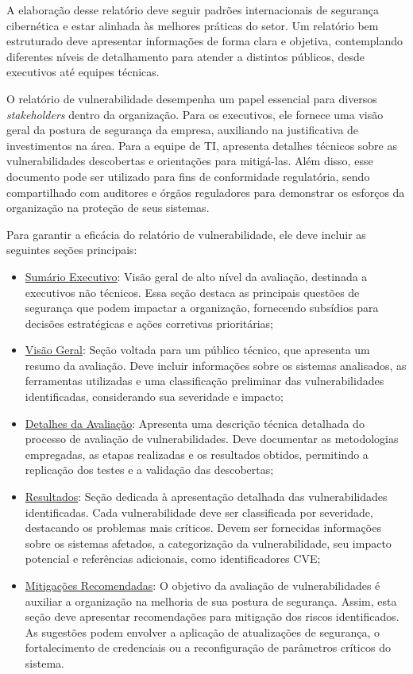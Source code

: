         A elaboração desse relatório deve seguir padrões internacionais de segurança cibernética e estar alinhada às melhores práticas do setor. Um relatório bem estruturado deve apresentar informações de forma clara e objetiva, contemplando diferentes níveis de detalhamento para atender a distintos públicos, desde executivos até equipes técnicas.
        
        O relatório de vulnerabilidade desempenha um papel essencial para diversos \textit{stakeholders} dentro da organização. Para os executivos, ele fornece uma visão geral da postura de segurança da empresa, auxiliando na justificativa de investimentos na área. Para a equipe de TI, apresenta detalhes técnicos sobre as vulnerabilidades descobertas e orientações para mitigá-las. Além disso, esse documento pode ser utilizado para fins de conformidade regulatória, sendo compartilhado com auditores e órgãos reguladores para demonstrar os esforços da organização na proteção de seus sistemas.
        
        Para garantir a eficácia do relatório de vulnerabilidade, ele deve incluir as seguintes seções principais:
        
        \begin{itemize}
            \item \underline{Sumário Executivo}: Visão geral de alto nível da avaliação, destinada a executivos não técnicos. Essa seção destaca as principais questões de segurança que podem impactar a organização, fornecendo subsídios para decisões estratégicas e ações corretivas prioritárias;
            \item \underline{Visão Geral}: Seção voltada para um público técnico, que apresenta um resumo da avaliação. Deve incluir informações sobre os sistemas analisados, as ferramentas utilizadas e uma classificação preliminar das vulnerabilidades identificadas, considerando sua severidade e impacto;
            \item \underline{Detalhes da Avaliação}: Apresenta uma descrição técnica detalhada do processo de avaliação de vulnerabilidades. Deve documentar as metodologias empregadas, as etapas realizadas e os resultados obtidos, permitindo a replicação dos testes e a validação das descobertas;
            \item \underline{Resultados}: Seção dedicada à apresentação detalhada das vulnerabilidades identificadas. Cada vulnerabilidade deve ser classificada por severidade, destacando os problemas mais críticos. Devem ser fornecidas informações sobre os sistemas afetados, a categorização da vulnerabilidade, seu impacto potencial e referências adicionais, como identificadores CVE;
            \item \underline{Mitigações Recomendadas}: O objetivo da avaliação de vulnerabilidades é auxiliar a organização na melhoria de sua postura de segurança. Assim, esta seção deve apresentar recomendações para mitigação dos riscos identificados. As sugestões podem envolver a aplicação de atualizações de segurança, o fortalecimento de credenciais ou a reconfiguração de parâmetros críticos do sistema.
        \end{itemize}
    
